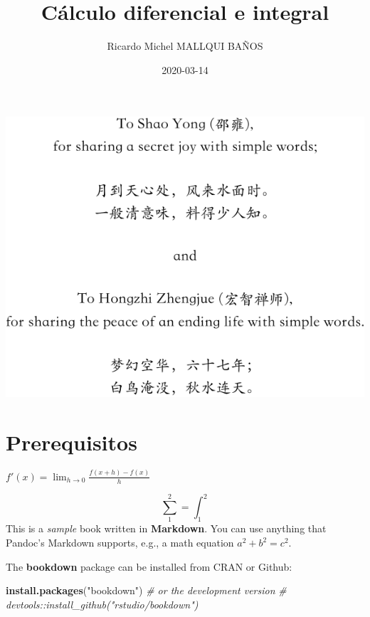 \documentclass[]{krantz}
\title{Cálculo diferencial e integral}
\author{Ricardo Michel MALLQUI BAÑOS}
\date{2020-03-14}
\makeatletter
\newenvironment{Shaded}{\begin{snugshade}}{\end{snugshade}}
\newcommand{\CommentTok}[1]{\textcolor[rgb]{0.37,0.37,0.37}{\textit{#1}}}
\newcommand{\KeywordTok}[1]{\textcolor[rgb]{0.27,0.27,0.27}{\textbf{#1}}}
\newcommand{\NormalTok}[1]{#1}
\newcommand{\StringTok}[1]{\textcolor[rgb]{0.5,0.5,0.5}{#1}}
\renewcommand*{\cleardoublepage}{\clearpage\if@twoside \ifodd\c@page\else
	\hbox{}%
	\thispagestyle{empty}%
	\newpage%
	\if@twocolumn\hbox{}\newpage\fi\fi\fi}
\makeatother
\begin{document}
\maketitle

\thispagestyle{empty}
\begin{center}
\includegraphics{dedication.pdf}
\end{center}


{
\setcounter{tocdepth}{1}
\tableofcontents
}
\hypertarget{prerequisitos}{%
\chapter*{Prerequisitos}\label{prerequisitos}}

\(f'(x)=\lim _{h\to 0}\frac{f(x+h)-f(x)}{h}\)

\[\sum_1^2=\int_1^2\]
This is a \emph{sample} book written in \textbf{Markdown}. You can use anything that Pandoc's Markdown supports, e.g., a math equation \(a^2 + b^2 = c^2\).

The \textbf{bookdown} package can be installed from CRAN or Github:

\begin{Shaded}
\begin{Highlighting}[]
\KeywordTok{install.packages}\NormalTok{(}\StringTok{"bookdown"}\NormalTok{)}
\CommentTok{# or the development version}
\CommentTok{# devtools::install_github("rstudio/bookdown")}
\end{Highlighting}
\end{Shaded}
\end{document}
